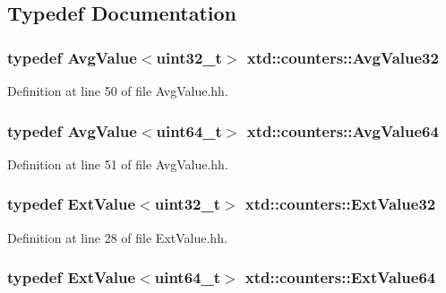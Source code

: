 \subsection{Typedef Documentation}
\subsubsection[{\texorpdfstring{Avg\+Value32}{AvgValue32}}]{\setlength{\rightskip}{0pt plus 5cm}typedef {\bf Avg\+Value}$<$uint32\+\_\+t$>$ {\bf xtd\+::counters\+::\+Avg\+Value32}}\hypertarget{namespacextd_1_1counters_a162dd5cde0e6fcc970c543f7420b4c14}{}\label{namespacextd_1_1counters_a162dd5cde0e6fcc970c543f7420b4c14}


Definition at line 50 of file Avg\+Value.\+hh.

\subsubsection[{\texorpdfstring{Avg\+Value64}{AvgValue64}}]{\setlength{\rightskip}{0pt plus 5cm}typedef {\bf Avg\+Value}$<$uint64\+\_\+t$>$ {\bf xtd\+::counters\+::\+Avg\+Value64}}\hypertarget{namespacextd_1_1counters_aa43118623f65cdf1ba43bffd8f17ea0e}{}\label{namespacextd_1_1counters_aa43118623f65cdf1ba43bffd8f17ea0e}


Definition at line 51 of file Avg\+Value.\+hh.

\subsubsection[{\texorpdfstring{Ext\+Value32}{ExtValue32}}]{\setlength{\rightskip}{0pt plus 5cm}typedef {\bf Ext\+Value}$<$uint32\+\_\+t$>$ {\bf xtd\+::counters\+::\+Ext\+Value32}}\hypertarget{namespacextd_1_1counters_ae049cff0f00adb1728a511d333c2aa50}{}\label{namespacextd_1_1counters_ae049cff0f00adb1728a511d333c2aa50}


Definition at line 28 of file Ext\+Value.\+hh.

\subsubsection[{\texorpdfstring{Ext\+Value64}{ExtValue64}}]{\setlength{\rightskip}{0pt plus 5cm}typedef {\bf Ext\+Value}$<$uint64\+\_\+t$>$ {\bf xtd\+::counters\+::\+Ext\+Value64}}\hypertarget{namespacextd_1_1counters_ad0d26d26ad71069f92a20b6d870e4872}{}\label{namespacextd_1_1counters_ad0d26d26ad71069f92a20b6d870e4872}


